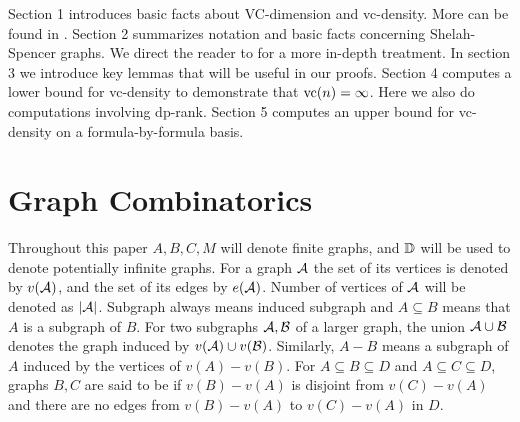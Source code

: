 Section 1 introduces basic facts about VC-dimension and vc-density.
More can be found in \cite{density}.
Section 2 summarizes notation and basic facts concerning Shelah-Spencer graphs.
We direct the reader to \cite{laskowski} for a more in-depth treatment.
In section 3 we introduce key lemmas that will be useful in our proofs.
Section 4 computes a lower bound for vc-density to demonstrate that $\operatorname{vc}(n) = \infty$.
Here we also do computations involving dp-rank.
Section 5 computes an upper bound for vc-density on a formula-by-formula basis.



\section{Graph Combinatorics}

Throughout this paper $A, B, C, M$ will denote finite graphs, and $\mathbb D$ will be used to denote potentially infinite graphs.
For a graph $\mathcal A$ the set of its vertices is denoted by $v(\mathcal A)$, and the set of its edges by $e(\mathcal A)$.
Number of vertices of $\mathcal A$ will be denoted as $|\mathcal A|$.
Subgraph always means induced subgraph and $A \subseteq B$ means that $A$ is a subgraph of $B$.
For two subgraphs $\mathcal A, \mathcal B$ of a larger graph, the union $\mathcal A \cup \mathcal B$ denotes the graph induced by $v(\mathcal A) \cup v(\mathcal B)$.
Similarly, $A - B$ means a subgraph of $A$ induced by the vertices of $v(A) - v(B)$.
For $A \subseteq B \subseteq D$ and $A \subseteq C \subseteq D$,
graphs $B,C$ are said to be  if $v(B) - v(A)$ is disjoint from $v(C) - v(A)$
and there are no edges from $v(B) - v(A)$ to $v(C) - v(A)$ in $D$.

